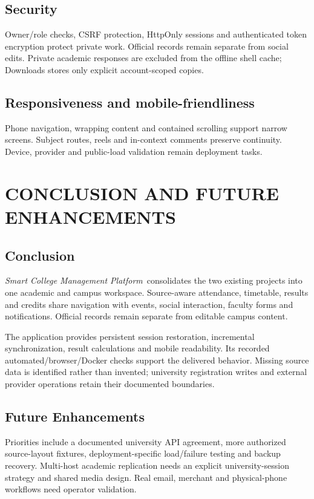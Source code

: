 \documentclass[10pt]{report}
\newcommand{\project}{\textit{\ProjectName}}
\newcommand{\ProjectName}{Smart College Management Platform}
\begin{document}
\section{Security}
Owner/role checks, CSRF protection, HttpOnly sessions and authenticated token encryption protect private work\cite{owasp,rbac}. Official records remain separate from social edits. Private academic responses are excluded from the offline shell cache; Downloads stores only explicit account-scoped copies.
\section{Responsiveness and mobile-friendliness}
Phone navigation, wrapping content and contained scrolling support narrow screens. Subject routes, reels and in-context comments preserve continuity. Device, provider and public-load validation remain deployment tasks.

\chapter{CONCLUSION AND FUTURE ENHANCEMENTS}
\linespread{1.5}\selectfont
\section{Conclusion}
\project\ consolidates the two existing projects into one academic and campus workspace. Source-aware attendance, timetable, results and credits share navigation with events, social interaction, faculty forms and notifications. Official records remain separate from editable campus content.

The application provides persistent session restoration, incremental synchronization, result calculations and mobile readability. Its recorded automated/browser/Docker checks support the delivered behavior. Missing source data is identified rather than invented; university registration writes and external provider operations retain their documented boundaries.

\section{Future Enhancements}
Priorities include a documented university API agreement, more authorized source-layout fixtures, deployment-specific load/failure testing and backup recovery. Multi-host academic replication needs an explicit university-session strategy and shared media design. Real email, merchant and physical-phone workflows need operator validation.
\end{document}
